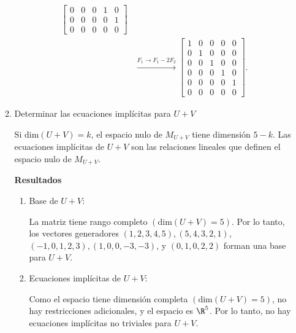 \begin{enumerate}[label=\color{red}\textbf{\arabic*)}]
\begin{enumerate}[label=Paso \arabic*:]
\[\begin{aligned}
\begin{bmatrix}
            0 & 0 & 0 & 1 & 0\\
            0 & 0 & 0 & 0 & 1\\
            0 & 0 & 0 & 0 & 0
        \end{bmatrix}\\
& \xrightarrow{F_1\to F_1-2F_2}\begin{bmatrix} 
            1 & 0 & 0 & 0 & 0\\
            0 & 1 & 0 & 0 & 0\\
            0 & 0 & 1 & 0 & 0\\
            0 & 0 & 0 & 1 & 0\\
            0 & 0 & 0 & 0 & 1\\
            0 & 0 & 0 & 0 & 0
        \end{bmatrix}.
        \end{aligned}
        \]  
    \item Determinar las ecuaciones implícitas para $U+V$

        Si  $\mathrm{dim}(U+V)=k$, el espacio nulo de $M_{U+V}$ tiene dimensión $5-k$. Las ecuaciones implícitas de $U+V$ son las relaciones lineales que definen el espacio nulo de $M_{U+V}$.

\textbf{Resultados}
\begin{enumerate}[label=\arabic*)]
\item Base de $U+V$:

La matriz tiene rango completo $(\mathrm{dim}(U+V)=5)$. Por lo tanto, los vectores generadores $(1,2,3,4,5),(5,4,3,2,1)$, $(-1,0,1,2,3),(1,0,0,-3,-3)$, y $(0,1,0,2,2)$ forman una base para $U+V$.
\item Ecuaciones implícitas de $U+V$:

Como el espacio tiene dimensión completa $(\mathrm{dim}(U+V)=5)$, no hay restricciones adicionales, y el espacio es $\R^5$. Por lo tanto, no hay ecuaciones implícitas no triviales para $U+V$.
\end{enumerate}
\end{enumerate}
\end{enumerate}

